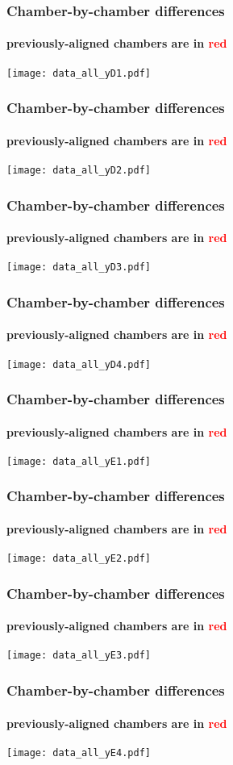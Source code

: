 \documentclass[compress]{beamer}
\begin{document}
\begin{frame}
\frametitle{Chamber-by-chamber differences}
\framesubtitle{previously-aligned chambers are in \textcolor{red}{red}}
\texttt{[image: data\_all\_yD1.pdf]}
\end{frame}

\begin{frame}
\frametitle{Chamber-by-chamber differences}
\framesubtitle{previously-aligned chambers are in \textcolor{red}{red}}
\texttt{[image: data\_all\_yD2.pdf]}
\end{frame}

\begin{frame}
\frametitle{Chamber-by-chamber differences}
\framesubtitle{previously-aligned chambers are in \textcolor{red}{red}}
\texttt{[image: data\_all\_yD3.pdf]}
\end{frame}

\begin{frame}
\frametitle{Chamber-by-chamber differences}
\framesubtitle{previously-aligned chambers are in \textcolor{red}{red}}
\texttt{[image: data\_all\_yD4.pdf]}
\end{frame}

\begin{frame}
\frametitle{Chamber-by-chamber differences}
\framesubtitle{previously-aligned chambers are in \textcolor{red}{red}}
\texttt{[image: data\_all\_yE1.pdf]}
\end{frame}

\begin{frame}
\frametitle{Chamber-by-chamber differences}
\framesubtitle{previously-aligned chambers are in \textcolor{red}{red}}
\texttt{[image: data\_all\_yE2.pdf]}
\end{frame}

\begin{frame}
\frametitle{Chamber-by-chamber differences}
\framesubtitle{previously-aligned chambers are in \textcolor{red}{red}}
\texttt{[image: data\_all\_yE3.pdf]}
\end{frame}

\begin{frame}
\frametitle{Chamber-by-chamber differences}
\framesubtitle{previously-aligned chambers are in \textcolor{red}{red}}
\texttt{[image: data\_all\_yE4.pdf]}
\end{frame}
\end{document}
